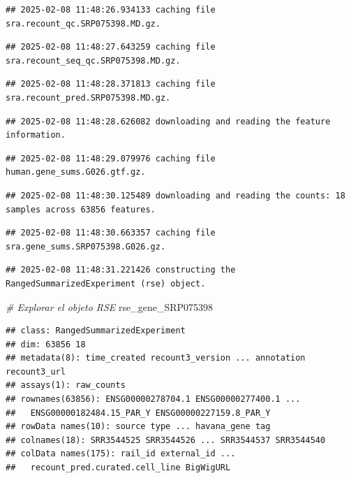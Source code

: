 \documentclass[
]{article}
\newenvironment{Shaded}{\begin{snugshade}}{\end{snugshade}}
\newcommand{\CommentTok}[1]{\textcolor[rgb]{0.56,0.35,0.01}{\textit{#1}}}
\newcommand{\NormalTok}[1]{#1}
\begin{document}
\begin{verbatim}
## 2025-02-08 11:48:26.934133 caching file sra.recount_qc.SRP075398.MD.gz.
\end{verbatim}

\begin{verbatim}
## 2025-02-08 11:48:27.643259 caching file sra.recount_seq_qc.SRP075398.MD.gz.
\end{verbatim}

\begin{verbatim}
## 2025-02-08 11:48:28.371813 caching file sra.recount_pred.SRP075398.MD.gz.
\end{verbatim}

\begin{verbatim}
## 2025-02-08 11:48:28.626082 downloading and reading the feature information.
\end{verbatim}

\begin{verbatim}
## 2025-02-08 11:48:29.079976 caching file human.gene_sums.G026.gtf.gz.
\end{verbatim}

\begin{verbatim}
## 2025-02-08 11:48:30.125489 downloading and reading the counts: 18 samples across 63856 features.
\end{verbatim}

\begin{verbatim}
## 2025-02-08 11:48:30.663357 caching file sra.gene_sums.SRP075398.G026.gz.
\end{verbatim}

\begin{verbatim}
## 2025-02-08 11:48:31.221426 constructing the RangedSummarizedExperiment (rse) object.
\end{verbatim}

\begin{Shaded}
\begin{Highlighting}[]
\CommentTok{\# Explorar el objeto RSE}
\NormalTok{rse\_gene\_SRP075398}
\end{Highlighting}
\end{Shaded}

\begin{verbatim}
## class: RangedSummarizedExperiment 
## dim: 63856 18 
## metadata(8): time_created recount3_version ... annotation recount3_url
## assays(1): raw_counts
## rownames(63856): ENSG00000278704.1 ENSG00000277400.1 ...
##   ENSG00000182484.15_PAR_Y ENSG00000227159.8_PAR_Y
## rowData names(10): source type ... havana_gene tag
## colnames(18): SRR3544525 SRR3544526 ... SRR3544537 SRR3544540
## colData names(175): rail_id external_id ...
##   recount_pred.curated.cell_line BigWigURL
\end{verbatim}
\end{document}
